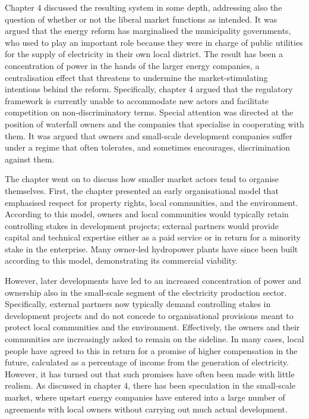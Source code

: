 Chapter 4 discussed the resulting system in some depth, addressing also the question of whether or not the liberal market functions as intended. It was argued that the energy reform has marginalised the municipality governments, who used to play an important role because they were in charge of public utilities for the supply of electricity in their own local district. The result has been a concentration of power in the hands of the larger energy companies, a centralisation effect that threatens to undermine the market-stimulating intentions behind the reform. Specifically, chapter 4 argued that the regulatory framework is currently unable to accommodate new actors and facilitate competition on non-discriminatory terms. Special attention was directed at the position of waterfall owners and the companies that specialise in cooperating with them. It was argued that owners and small-scale development companies suffer under a regime that often tolerates, and sometimes encourages, discrimination against them.

The chapter went on to discuss how smaller market actors tend to organise themselves. First, the chapter presented an early organisational model that emphasised respect for property rights, local communities, and the environment. According to this model, owners and local communities would typically retain controlling stakes in development projects; external partners would provide capital and technical expertise either as a paid service or in return for a minority stake in the enterprise. Many owner-led hydropower plants have since been built according to this model, demonstrating its commercial viability. 

However, later developments have led to an increased concentration of power and ownership also in the small-scale segment of the electricity production sector. Specifically, external partners now typically demand controlling stakes in development projects and do not concede to organisational provisions meant to protect local communities and the environment. Effectively, the owners and their communities are increasingly asked to remain on the sideline. In many cases, local people have agreed to this in return for a promise of higher compensation in the future, calculated as a percentage of income from the generation of electricity. However, it has turned out that such promises have often been made with little realism. As discussed in chapter 4, there has been speculation in the small-scale market, where upstart energy companies have entered into a large number of agreements with local owners without carrying out much actual development. %

